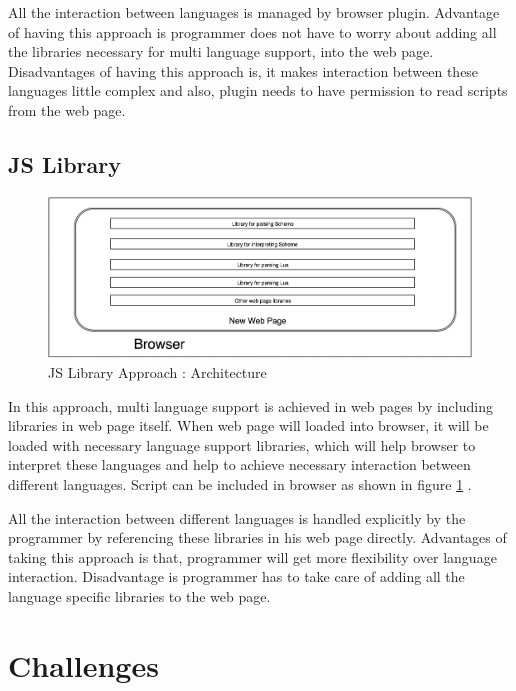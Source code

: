   All the interaction between languages is managed by browser plugin. Advantage of having this approach is programmer does not have to worry about adding all the libraries necessary for multi language support, into the web page. Disadvantages of having this approach is, it makes interaction between these languages little complex and also, plugin needs to have permission to read scripts from the web page.
  

	
\subsection{JS Library}

\begin{figure}[ht]
	\begin{center}
		\includegraphics[width=\linewidth]{./images/JSLibraryApproach.png}
	\end{center}
	\caption{JS Library Approach : Architecture}
	\label{fig:jslibraryarchitecture}
\end{figure}

   In this approach, multi language support is achieved in web pages by including libraries in web page itself. When web page will loaded into browser, it will be loaded with necessary language support libraries, which will help browser to interpret these languages and help to achieve necessary interaction between different languages. Script can be included in browser as shown in figure \ref{fig:jslibraryarchitecture} .
   
   All the interaction between different languages is handled explicitly by the programmer by referencing these libraries in his web page directly. Advantages of taking this approach is that, programmer will get more flexibility over language interaction. Disadvantage is programmer has to take care of adding all the language specific libraries to the web page.  

\section{Challenges}


